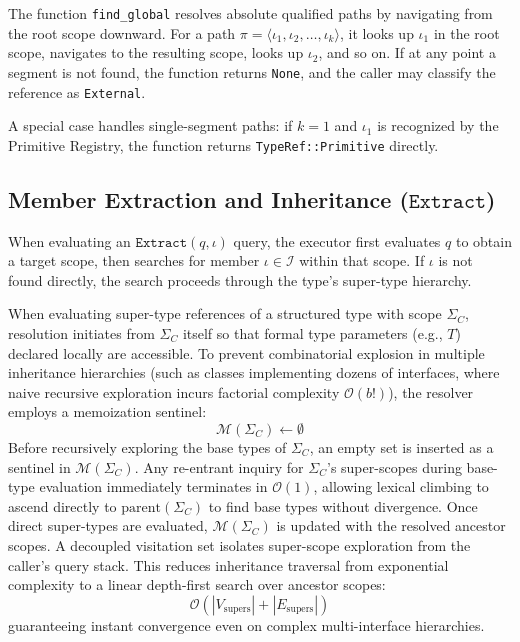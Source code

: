 The function \texttt{find\_global} resolves absolute qualified paths
by navigating from the root scope downward. For a path $\pi = \langle \iota_1,
\iota_2, \ldots, \iota_k \rangle$, it looks up $\iota_1$ in the root scope,
navigates to the resulting scope, looks up $\iota_2$, and so on. If at
any point a segment is not found, the function returns \texttt{None},
and the caller may classify the reference as \texttt{External}.

A special case handles single-segment paths: if $k = 1$ and $\iota_1$ is
recognized by the Primitive Registry, the function returns
\texttt{TypeRef::Primitive} directly.

\subsection{Member Extraction and Inheritance ($\texttt{Extract}$)}
\label{sec:inheritance_resolution}

When evaluating an $\texttt{Extract}(q, \iota)$ query, the executor first
evaluates $q$ to obtain a target scope, then searches for member
$\iota \in \mathcal{I}$
within that scope. If $\iota$ is not found directly, the search proceeds
through the type's super-type hierarchy.

When evaluating super-type references of a structured type with scope
$\Sigma_C$, resolution initiates from $\Sigma_C$ itself so that formal
type parameters (e.g., $T$) declared locally are accessible.
To prevent combinatorial explosion in multiple inheritance hierarchies
(such as classes implementing dozens of interfaces, where naive recursive
exploration incurs factorial complexity $\mathcal{O}(b!)$), the resolver
employs a memoization sentinel:
$$\mathcal{M}(\Sigma_C) \leftarrow \emptyset$$
Before recursively exploring the base types of $\Sigma_C$, an empty set
is inserted as a sentinel in $\mathcal{M}(\Sigma_C)$. Any re-entrant inquiry
for $\Sigma_C$'s super-scopes during base-type evaluation immediately
terminates in $\mathcal{O}(1)$, allowing lexical climbing to ascend
directly to $\text{parent}(\Sigma_C)$ to find base types without divergence.
Once direct super-types are evaluated, $\mathcal{M}(\Sigma_C)$ is updated
with the resolved ancestor scopes. A decoupled visitation set isolates
super-scope exploration from the caller's query stack. This reduces
inheritance traversal from exponential complexity to a linear depth-first
search over ancestor scopes:
$$\mathcal{O}(|V_{\text{supers}}| + |E_{\text{supers}}|)$$
guaranteeing instant convergence even on complex multi-interface hierarchies.

